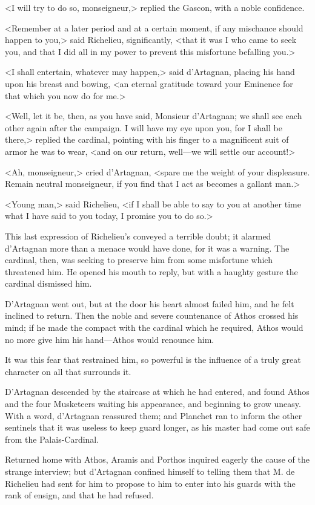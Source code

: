 <I will try to do so, monseigneur,> replied the Gascon, with a noble confidence. 

<Remember at a later period and at a certain moment, if any mischance should happen to you,> said Richelieu, significantly, <that it was I who came to seek you, and that I did all in my power to prevent this misfortune befalling you.> 

<I shall entertain, whatever may happen,> said d'Artagnan, placing his hand upon his breast and bowing, <an eternal gratitude toward your Eminence for that which you now do for me.> 

<Well, let it be, then, as you have said, Monsieur d'Artagnan; we shall see each other again after the campaign. I will have my eye upon you, for I shall be there,> replied the cardinal, pointing with his finger to a magnificent suit of armor he was to wear, <and on our return, well---we will settle our account!> 

<Ah, monseigneur,> cried d'Artagnan, <spare me the weight of your displeasure. Remain neutral monseigneur, if you find that I act as becomes a gallant man.> 

<Young man,> said Richelieu, <if I shall be able to say to you at another time what I have said to you today, I promise you to do so.> 

This last expression of Richelieu's conveyed a terrible doubt; it alarmed d'Artagnan more than a menace would have done, for it was a warning. The cardinal, then, was seeking to preserve him from some misfortune which threatened him. He opened his mouth to reply, but with a haughty gesture the cardinal dismissed him. 

D'Artagnan went out, but at the door his heart almost failed him, and he felt inclined to return. Then the noble and severe countenance of Athos crossed his mind; if he made the compact with the cardinal which he required, Athos would no more give him his hand---Athos would renounce him. 

It was this fear that restrained him, so powerful is the influence of a truly great character on all that surrounds it. 

D'Artagnan descended by the staircase at which he had entered, and found Athos and the four Musketeers waiting his appearance, and beginning to grow uneasy. With a word, d'Artagnan reassured them; and Planchet ran to inform the other sentinels that it was useless to keep guard longer, as his master had come out safe from the Palais-Cardinal. 

Returned home with Athos, Aramis and Porthos inquired eagerly the cause of the strange interview; but d'Artagnan confined himself to telling them that M. de Richelieu had sent for him to propose to him to enter into his guards with the rank of ensign, and that he had refused. 


